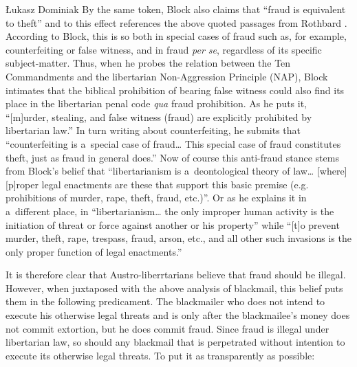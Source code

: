 \begin{artengenv}{Łukasz Dominiak}
By the same token, Block 
\parencite*[][p.294]{block_libertarian_1998} %
 also claims that ``fraud is equivalent to theft'' and to this effect references the above quoted passages from Rothbard 
\parencite*[][pp.77–78]{rothbard_ethics_1998}. %
 According to Block, this is so both in special cases of fraud such as, for example, counterfeiting or false witness, and in fraud \textit{per se}, regardless of its specific subject-matter. Thus, when he 
\parencite*[][p.38]{block_natural_2015} %
 probes the relation between the Ten Commandments and the libertarian Non-Aggression Principle (NAP), Block intimates that the biblical prohibition of bearing false witness could also find its place in the libertarian penal code \textit{qua} fraud prohibition. As he 
\parencite*[][p.38]{block_natural_2015} %
 puts it, ``[m]urder, stealing, and false witness (fraud) are explicitly prohibited by libertarian law.'' In turn writing about counterfeiting, he 
\parencite*[][p.99]{block_defending_2018} %
 submits that ``counterfeiting is a~special case of fraud… This special case of fraud constitutes theft, just as fraud in general does.'' Now of course this anti-fraud stance stems from Block's 
\parencite*[][p.275]{block_libertarianism_2004} %
 belief that ``libertarianism is a~deontological theory of law… [where] [p]roper legal enactments are these that support this basic premise (e.g. prohibitions of murder, rape, theft, fraud, etc.)''. Or as he 
\parencite*[][p.1889]{block_environmentalism_1998} %
 explains it in a~different place, in ``libertarianism… the only improper human activity is the initiation of threat or force against another or his property'' while ``[t]o prevent murder, theft, rape, trespass, fraud, arson, etc., and all other such invasions is the only proper function of legal enactments.''



It is therefore clear that Austro-liberrtarians believe that fraud should be illegal. However, when juxtaposed with the above analysis of blackmail, this belief puts them in the following predicament. The blackmailer who does not intend to execute his otherwise legal threats and is only after the blackmailee's money does not commit extortion, but he does commit fraud. Since fraud is illegal under libertarian law, so should any blackmail that is perpetrated without intention to execute its otherwise legal threats. To put it as transparently as possible:



\end{artengenv}
